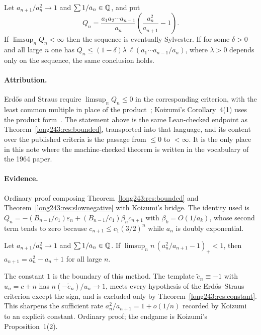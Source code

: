 \documentclass[11pt]{article}
\begin{document}
\begin{theorem}\label{long243:res:strausbounded}
Let $a_{n+1}/a_n^2\to1$ and $\sum1/a_n\in\mathbb{Q}$, and put
\[
 Q_n=\frac{a_1a_2\cdots a_{n-1}}{a_n}
     \left(\frac{a_n^2}{a_{n+1}}-1\right).
\]
If $\limsup_nQ_n<\infty$ then the sequence is eventually Sylvester.  If for
some $\delta>0$ and all large $n$ one has
$Q_n\le(1-\delta)\lambda\,\ell(a_1\cdots a_{n-1}/a_n)$, where $\lambda>0$
depends only on the sequence, the same conclusion holds.
\end{theorem}

\paragraph{Attribution.}
Erd\H{o}s and Straus require $\limsup_nQ_n\le0$ in the corresponding criterion,
with the least common multiple in place of the product~\cite[Theorem~3,
p.~132]{erdosstraus1964}; Koizumi's Corollary~4(1) uses the product
form~\cite[Cor.~4(1), pp.~14--15]{koizumi2025}.  The statement above is the same
Lean-checked endpoint as Theorem~\ref{long243:res:bounded}, transported into that
language, and its content over the published criteria is the passage from
$\le0$ to $<\infty$.  It is the only place in this note where the machine-checked
theorem is written in the vocabulary of the 1964 paper.

\paragraph{Evidence.}
Ordinary proof composing Theorem~\ref{long243:res:bounded} and
Theorem~\ref{long243:res:slownegative} with Koizumi's bridge.  The identity used is
$Q_n=-(B_{n-1}/c_1)\varepsilon_n+(B_{n-1}/c_1)\beta_nc_{n+1}$ with
$\beta_k=O(1/a_k)$, whose second term tends to zero because $c_{n+1}\le
c_1(3/2)^n$ while $a_n$ is doubly exponential.

\begin{theorem}\label{long243:res:onethreshold}
Let $a_{n+1}/a_n^2\to1$ and $\sum1/a_n\in\mathbb{Q}$.  If
$\limsup_n n\,(a_n^2/a_{n+1}-1)_+<1$, then $a_{n+1}=a_n^2-a_n+1$ for all large
$n$.
\end{theorem}

\noindent The constant $1$ is the boundary of this method.  The template
$\tilde e_n\equiv-1$ with $u_n=c+n$ has $n(-\tilde e_n)/u_n\to1$, meets
every hypothesis of the Erd\H{o}s--Straus criterion except the sign, and is
excluded only by Theorem~\ref{long243:res:constant}.  This sharpens the sufficient rate
$a_n^2/a_{n+1}=1+o(1/n)$ recorded by Koizumi~\cite[Remark~3, p.~16]{koizumi2025} to an explicit constant.  Ordinary proof; the endgame is
Koizumi's Proposition~1(2).
\end{document}
